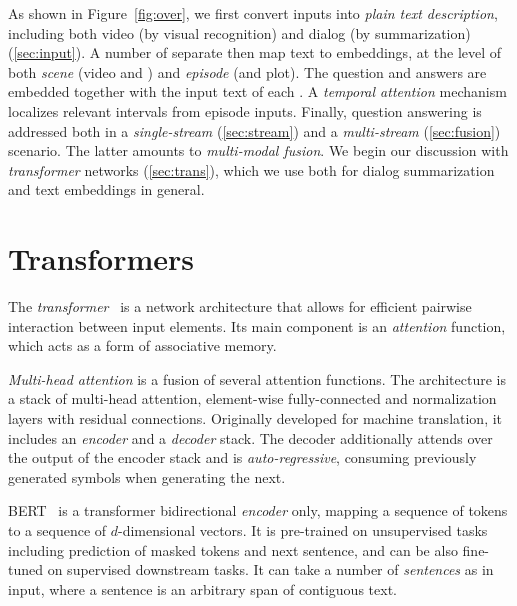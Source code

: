 \documentclass[10pt,twocolumn,letterpaper]{article}
\begin{document}
As shown in Figure~\ref{fig:over}, we first convert inputs into \emph{plain text description}, including both video (by visual recognition) and dialog (by summarization) (\autoref{sec:input}). A number of separate \emph{\branches} then map text to embeddings, at the level of both \emph{scene} (video and \sceneSum) and \emph{episode} (\episodeSum and plot). The question and answers are embedded together with the input text of each \branch. A \emph{temporal attention} mechanism localizes relevant intervals from episode inputs. Finally, question answering is addressed both in a \emph{single-stream} (\autoref{sec:stream}) and a \emph{multi-stream} (\autoref{sec:fusion}) scenario. The latter amounts to \emph{multi-modal fusion}. We begin our discussion with \emph{transformer} networks (\autoref{sec:trans}), which we use both for dialog summarization and text embeddings in general. \section{Transformers}
\label{sec:trans}

The \emph{transformer}~\cite{transformervaswani2017attention} is a network architecture that allows for efficient pairwise interaction between input elements. Its main component is an \emph{attention} function, which acts as a form of associative memory.

\emph{Multi-head attention} is a fusion of several attention functions.
The architecture is a stack of multi-head attention, element-wise fully-connected and normalization layers with residual connections. Originally developed for machine translation, it includes an \emph{encoder} and a \emph{decoder} stack. The decoder additionally attends over the output of the encoder stack and is \emph{auto-regressive}, consuming previously generated symbols when generating the next.

BERT~\cite{devlin-etal-2019-bert} is a transformer bidirectional \emph{encoder} only, mapping a sequence of tokens to a sequence of $d$-dimensional vectors. It is pre-trained on unsupervised tasks including prediction of masked tokens and next sentence, and can be also fine-tuned on supervised downstream tasks. It can take a number of \emph{sentences} as in input, where a sentence is an arbitrary span of contiguous text.
\end{document}
